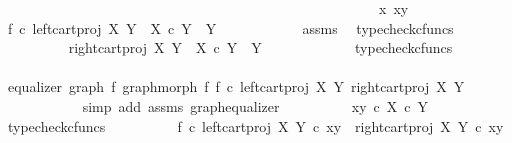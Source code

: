 \begin{isabellebody}
\ \ \ \ \ \ \ \ \ \ \ \ \ \ \ \ \ \ \ \ \ \ \ \ \ \ \ \ \ \ \ \ \ \ \ \ \ \ \ \ \ \ \ \ \ \ \ \ \ \ \ \ \ \ x\ {\isacharequal}{\kern0pt}{\isachardoublequoteopen}{\isasymlangle}x{\isacharcomma}{\kern0pt}y{\isasymrangle}{\isachardoublequoteclose}{\isacharbrackright}{\kern0pt}{\isacharparenright}{\kern0pt}\isanewline
\ \ \ \ \ \ \ \ \isamarkupfalse%
\ {\isachardoublequoteopen}f\ {\isasymcirc}\isactrlsub c\ left{\isacharunderscore}{\kern0pt}cart{\isacharunderscore}{\kern0pt}proj\ X\ Y\ {\isacharcolon}{\kern0pt}\ X\ {\isasymtimes}\isactrlsub c\ Y\ {\isasymrightarrow}\ Y{\isachardoublequoteclose}\isanewline
\ \ \ \ \ \ \ \ \ \ \isamarkupfalse%
\ assms\ \isamarkupfalse%
\ typecheck{\isacharunderscore}{\kern0pt}cfuncs\isanewline
\ \ \ \ \ \ \ \ \isamarkupfalse%
\ {\isachardoublequoteopen}right{\isacharunderscore}{\kern0pt}cart{\isacharunderscore}{\kern0pt}proj\ X\ Y\ {\isacharcolon}{\kern0pt}\ X\ {\isasymtimes}\isactrlsub c\ Y\ {\isasymrightarrow}\ Y{\isachardoublequoteclose}\isanewline
\ \ \ \ \ \ \ \ \ \ \isamarkupfalse%
\ \ typecheck{\isacharunderscore}{\kern0pt}cfuncs\isanewline
\ \ \ \ \ \ \ \ \isamarkupfalse%
\ {\isachardoublequoteopen}equalizer\ {\isacharparenleft}{\kern0pt}graph\ f{\isacharparenright}{\kern0pt}\ {\isacharparenleft}{\kern0pt}graph{\isacharunderscore}{\kern0pt}morph\ f{\isacharparenright}{\kern0pt}\ {\isacharparenleft}{\kern0pt}f\ {\isasymcirc}\isactrlsub c\ left{\isacharunderscore}{\kern0pt}cart{\isacharunderscore}{\kern0pt}proj\ X\ Y{\isacharparenright}{\kern0pt}\ {\isacharparenleft}{\kern0pt}right{\isacharunderscore}{\kern0pt}cart{\isacharunderscore}{\kern0pt}proj\ X\ Y{\isacharparenright}{\kern0pt}{\isachardoublequoteclose}\isanewline
\ \ \ \ \ \ \ \ \ \ \isamarkupfalse%
\ {\isacharparenleft}{\kern0pt}simp\ add{\isacharcolon}{\kern0pt}\ assms\ graph{\isacharunderscore}{\kern0pt}equalizer{}{\isacharparenright}{\kern0pt}\isanewline
\ \ \ \ \ \ \ \ \isamarkupfalse%
\ {\isachardoublequoteopen}{\isasymlangle}x{\isacharcomma}{\kern0pt}y{\isasymrangle}\ {\isasymin}\isactrlsub c\ X\ {\isasymtimes}\isactrlsub c\ Y{\isachardoublequoteclose}\isanewline
\ \ \ \ \ \ \ \ \ \ \isamarkupfalse%
\ typecheck{\isacharunderscore}{\kern0pt}cfuncs\isanewline
\ \ \ \ \ \ \ \ \isamarkupfalse%
\ {\isachardoublequoteopen}{\isacharparenleft}{\kern0pt}f\ {\isasymcirc}\isactrlsub c\ left{\isacharunderscore}{\kern0pt}cart{\isacharunderscore}{\kern0pt}proj\ X\ Y{\isacharparenright}{\kern0pt}\ {\isasymcirc}\isactrlsub c\ {\isasymlangle}x{\isacharcomma}{\kern0pt}y{\isasymrangle}\ {\isacharequal}{\kern0pt}\ right{\isacharunderscore}{\kern0pt}cart{\isacharunderscore}{\kern0pt}proj\ X\ Y\ {\isasymcirc}\isactrlsub c\ {\isasymlangle}x{\isacharcomma}{\kern0pt}y{\isasymrangle}{\isachardoublequoteclose}\isanewline

\end{isabellebody}
